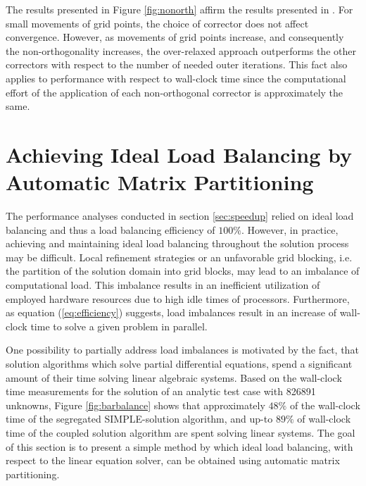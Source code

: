 The results presented in Figure \ref{fig:nonorth} affirm the results presented in \cite{jasak96}. For small movements of grid points, the choice of corrector does not affect convergence. However, as movements of grid points increase, and consequently the non-orthogonality increases, the over-relaxed approach outperforms the other correctors with respect to the number of needed outer iterations. This fact also applies to performance with respect to wall-clock time since the computational effort of the application of each non-orthogonal corrector is approximately the same.

\section{Achieving Ideal Load Balancing by Automatic Matrix Partitioning}
\label{sec:load}

The performance analyses conducted in section \ref{sec:speedup} relied on ideal load balancing and thus a load balancing efficiency of \(100\%\). However, in practice, achieving and maintaining ideal load balancing throughout the solution process may be difficult. Local refinement strategies or an unfavorable grid blocking, i.e. the partition of the solution domain into grid blocks, may lead to an imbalance of computational load. This imbalance results in an inefficient utilization of employed hardware resources due to high idle times of processors. Furthermore, as equation (\ref{eq:efficiency}) suggests, load imbalances result in an increase of wall-clock time to solve a given problem in parallel.

One possibility to partially address load imbalances is motivated by the fact, that solution algorithms which solve partial differential equations, spend a significant amount of their time solving linear algebraic systems. Based on the wall-clock time measurements for the solution of an analytic test case with 826891 unknowns, Figure \ref{fig:barbalance} shows that approximately \(48\%\) of the wall-clock time of the segregated SIMPLE-solution algorithm, and up-to \(89\%\) of wall-clock time of the coupled solution algorithm are spent solving linear systems. The goal of this section is to present a simple method by which ideal load balancing, with respect to the linear equation solver, can be obtained using automatic matrix partitioning.


